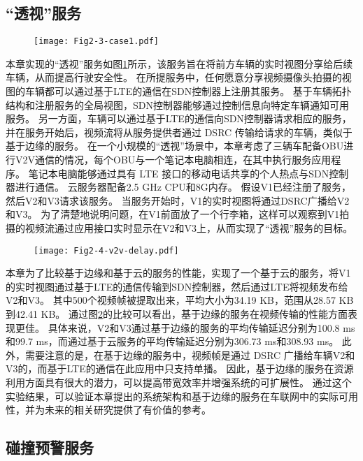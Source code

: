\subsection{“透视”服务}

\begin{figure}[h] 
	\centering
	\texttt{[image: Fig2-3-case1.pdf]}
	\label{fig 2-3}
\end{figure}

本章实现的“透视”服务如图\ref{fig 2-3}所示，该服务旨在将前方车辆的实时视图分享给后续车辆，从而提高行驶安全性。
在所提服务中，任何愿意分享视频摄像头拍摄的视图的车辆都可以通过基于LTE的通信在SDN控制器上注册其服务。
基于车辆拓扑结构和注册服务的全局视图，SDN控制器能够通过控制信息向特定车辆通知可用服务。
另一方面，车辆可以通过基于LTE的通信向SDN控制器请求相应的服务，并在服务开始后，视频流将从服务提供者通过 DSRC 传输给请求的车辆，类似于基于边缘的服务。
在一个小规模的“透视”场景中，本章考虑了三辆车配备OBU进行V2V通信的情况，每个OBU与一个笔记本电脑相连，在其中执行服务应用程序。
笔记本电脑能够通过具有 LTE 接口的移动电话共享的个人热点与SDN控制器进行通信。
云服务器配备2.5 GHz CPU和8G内存。
假设V1已经注册了服务，然后V2和V3请求该服务。
当服务开始时，V1的实时视图将通过DSRC广播给V2和V3。
为了清楚地说明问题，在V1前面放了一个行李箱，这样可以观察到V1拍摄的视频流通过应用接口实时显示在V2和V3上，从而实现了“透视”服务的目标。

\begin{figure}[h]
\centering
  \texttt{[image: Fig2-4-v2v-delay.pdf]}
  \label{fig 2-4}
\end{figure}

本章为了比较基于边缘和基于云的服务的性能，实现了一个基于云的服务，将V1的实时视图通过基于LTE的通信传输到SDN控制器，然后通过LTE将视频发布给V2和V3。
其中500个视频帧被提取出来，平均大小为34.19 KB，范围从28.57 KB到42.41 KB。
通过图\ref{fig 2-4}的比较可以看出，基于边缘的服务在视频传输的性能方面表现更佳。
具体来说，V2和V3通过基于边缘的服务的平均传输延迟分别为100.8 ms和99.7 ms，而通过基于云服务的平均传输延迟分别为306.73 ms和308.93 ms。
此外，需要注意的是，在基于边缘的服务中，视频帧是通过 DSRC 广播给车辆V2和V3的，而基于LTE的通信在此应用中只支持单播。
因此，基于边缘的服务在资源利用方面具有很大的潜力，可以提高带宽效率并增强系统的可扩展性。
通过这个实验结果，可以验证本章提出的系统架构和基于边缘的服务在车联网中的实际可用性，并为未来的相关研究提供了有价值的参考。

\subsection{碰撞预警服务}

